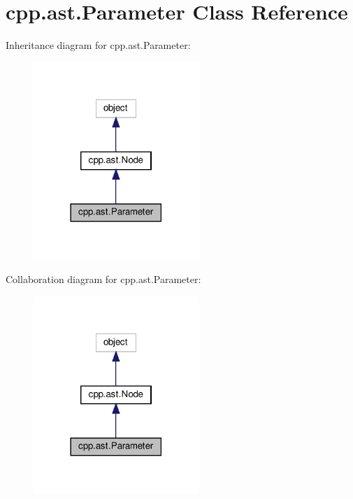 \hypertarget{classcpp_1_1ast_1_1_parameter}{}\section{cpp.\+ast.\+Parameter Class Reference}
\label{classcpp_1_1ast_1_1_parameter}


Inheritance diagram for cpp.\+ast.\+Parameter\+:
\nopagebreak
\begin{figure}[H]
\begin{center}
\leavevmode
\includegraphics[width=177pt]{classcpp_1_1ast_1_1_parameter__inherit__graph}
\end{center}
\end{figure}


Collaboration diagram for cpp.\+ast.\+Parameter\+:
\nopagebreak
\begin{figure}[H]
\begin{center}
\leavevmode
\includegraphics[width=177pt]{classcpp_1_1ast_1_1_parameter__coll__graph}
\end{center}
\end{figure}
